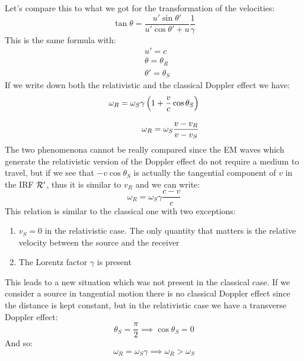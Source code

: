 Let's compare this to what we got for the transformation of the velocities:
\begin{equation}
  \tan \theta = \dfrac{u'\sin \theta'}{u'\cos \theta' + u}\dfrac{1}{\gamma}
\end{equation}
This is the same formula with:
\begin{equation}
  \begin{split}
    &u' = c \\[8pt]
    &\theta = \theta_R \\[8pt]
    &\theta' = \theta_S
  \end{split}
\end{equation}
If we write down both the relativistic and the classical Doppler effect we have:
\begin{equation}
  \begin{split}
    \omega_R  = \omega_S \gamma\left(1 + \dfrac{v}{c}\cos \theta_S\right) \\[8pt]
    \omega_R = \omega_S \dfrac{v - v_R}{v - v_S}
  \end{split}
\end{equation}
The two phenomenona cannot be really compared since the EM waves which generate the relativistic version of the Doppler effect do not require a medium to travel, but if we see that $-v \cos \theta_S$ is actually the tangential component of $v$ in the IRF $\mathcal{R}'$, thus it is similar to $v_R$ and we can write:
\begin{equation}
  \omega_R  = \omega_S \gamma\dfrac{c - v}{c}
\end{equation}
This relation is similar to the classical one with two exceptions:
\begin{enumerate}
  \item $v_S = 0$ in the relativistic case. The only quantity that matters is the relative velocity between the source and the receiver
  \item The Lorentz factor $\gamma$ is present
\end{enumerate}
This leads to a new situation which was not present in the classical case. If we consider a source in tangential motion there is no classical Doppler effect since the distance is kept constant, but in the relativistic case we have a transverse Doppler effect:
\begin{equation}
  \theta_S = \dfrac{\pi}{2} \implies \cos \theta_S = 0
\end{equation}
And so:
\begin{equation}
  \omega_R  = \omega_S \gamma \implies \omega_R  > \omega_S
\end{equation}
